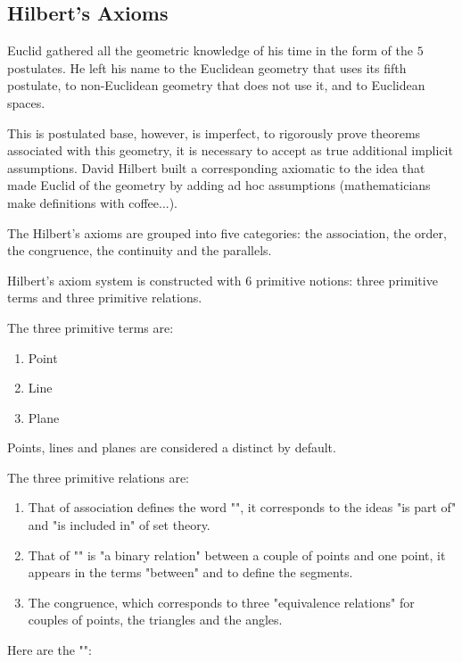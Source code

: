 	\pagebreak
	\subsection{Hilbert's Axioms}
	Euclid gathered all the geometric knowledge of his time in the form of the $5$ postulates. He left his name to the Euclidean geometry that uses its fifth postulate, to non-Euclidean geometry that does not use it, and to Euclidean spaces.

	This is postulated base, however, is imperfect, to rigorously prove theorems associated with this geometry, it is necessary to accept as true additional implicit assumptions. David Hilbert built a corresponding axiomatic to the idea that made Euclid  of the geometry by adding ad hoc assumptions (mathematicians make definitions with coffee...).

	The Hilbert's axioms are grouped into five categories: the association, the order, the congruence, the continuity and the parallels.

	Hilbert's axiom system is constructed with $6$ primitive notions: three primitive terms and three primitive relations.

	The three primitive terms are:
	\begin{enumerate}
		\item Point
		\item Line
		\item Plane
	\end{enumerate}
	\begin{tcolorbox}[title=Remark,colframe=black,arc=10pt]
	Points, lines and planes are considered a distinct by default.
	\end{tcolorbox}
	The three primitive relations are:
	\begin{enumerate}
		\item That of association defines the word "", it corresponds to the ideas "is part of" and "is included in" of set theory.

		\item That of "" is "a binary relation" between a couple of points and one point, it appears in the terms "between" and to define the segments.

		\item The congruence, which corresponds to three "equivalence relations" for couples of points, the triangles and the angles.
	\end{enumerate}

	\pagebreak	
	Here are the "":

